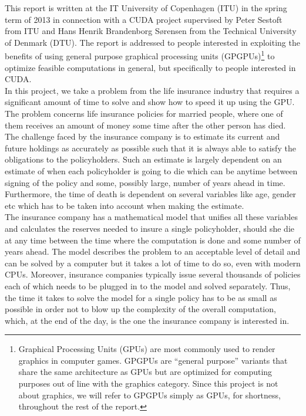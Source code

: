 This report is written at the IT University of Copenhagen (ITU) in the spring term of 2013 in connection with a CUDA project supervised by Peter Sestoft from ITU and Hans Henrik Brandenborg Sørensen from the Technical University of Denmark (DTU). The report is addressed to people interested in exploiting the benefits of using general purpose graphical processing units (GPGPUs)\footnote{Graphical Processing Units (GPUs) are most commonly used to render graphics in computer games. GPGPUs are ``general purpose'' variants that share the same architecture as GPUs but are optimized for computing purposes out of line with the graphics category. Since this project is not about graphics, we will refer to GPGPUs simply as GPUs, for shortness, throughout the rest of the report.} to optimize feasible computations in general, but specifically to people interested in CUDA. \\

In this project, we take a problem from the life insurance industry that requires a significant amount of time to solve and show how to speed it up using the GPU. The problem concerns life insurance policies for married people, where one of them receives an amount of money some time after the other person has died. The challenge faced by the insurance company is to estimate its current and future holdings as accurately as possible such that it is always able to satisfy the obligations to the policyholders. Such an estimate is largely dependent on an estimate of when each policyholder is going to die which can be anytime between signing of the policy and some, possibly large, number of years ahead in time. Furthermore, the time of death is dependent on several variables like age, gender etc which has to be taken into account when making the estimate.\\

The insurance company has a mathematical model that unifies all these variables and calculates the reserves needed to insure a single policyholder, should she die at any time between the time where the computation is done and some number of years ahead. The model describes the problem to an acceptable level of detail and can be solved by a computer but it takes a lot of time to do so, even with modern CPUs. Moreover, insurance companies typically issue several thousands of policies each of which needs to be plugged in to the model and solved separately. Thus, the time it takes to solve the model for a single policy has to be as small as possible in order not to blow up the complexity of the overall computation, which, at the end of the day, is the one the insurance company is interested in. \\

